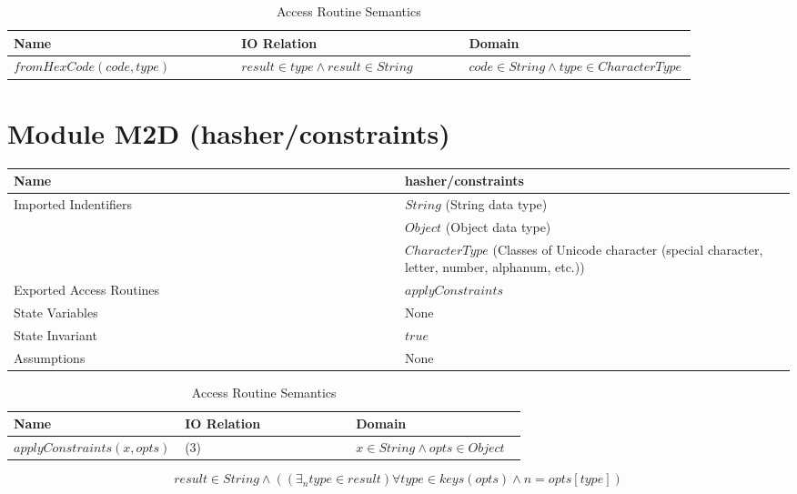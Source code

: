 \documentclass[12pt]{article}
\begin{document}
\begin{table}[!htbp]
\caption{Access Routine Semantics}
\begin{tabular}{|p{0.33\linewidth} | p{0.33\linewidth}|p{0.33\linewidth}|}
\hline
Name & IO Relation & Domain \\
\hline
$fromHexCode(code, type)$ & $result \in type \land result \in String$ & $code \in String \land type \in CharacterType$ \\
\hline
\end{tabular}
\end{table}

\newpage
\section{Module M2D (hasher/constraints)}

\begin{table}[!htbp]
\begin{tabular}{|p{0.5\linewidth} | p{0.5\linewidth}|}
\hline
Name & hasher/constraints \\
\hline
Imported Indentifiers & $String$ (String data type) \\
& $Object$ (Object data type) \\
& $CharacterType$ (Classes of Unicode character (special character, letter, number, alphanum, etc.)) \\
\hline
Exported Access Routines & $applyConstraints$ \\
\hline
State Variables & None \\
\hline
State Invariant & $true$ \\
\hline
Assumptions & None \\
\hline
\end{tabular}
\end{table}

\begin{table}[!htbp]
\caption{Access Routine Semantics}
\begin{tabular}{|p{0.33\linewidth} | p{0.33\linewidth}|p{0.33\linewidth}|}
\hline
Name & IO Relation & Domain \\
\hline
$applyConstraints(x, opts)$ & (3) & $x \in String \land opts \in Object$ \\
\hline
\end{tabular}
\end{table}

\begin{equation}
result \in String \land ((	\exists_{n} type \in result)\forall type \in keys(opts) \land n = opts[type])
\end{equation}
\end{document}
